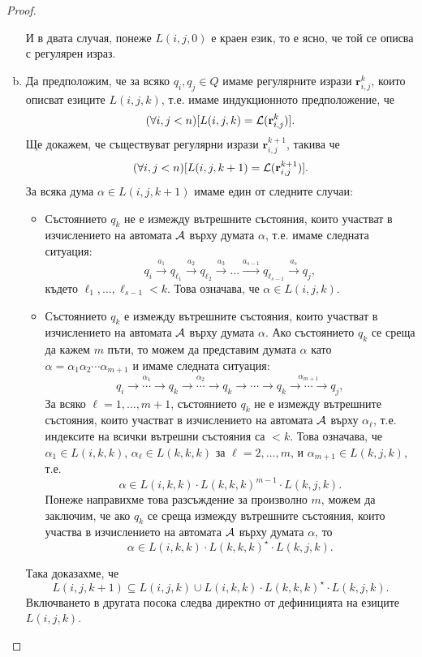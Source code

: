 \begin{proof}
\begin{enumerate}[a)]
    И в двата случая, понеже $L(i,j,0)$ е краен език, то е ясно, че той се описва с регулярен израз.
  \item
    Да предположим, че за всяко $q_i,q_j\in Q$ имаме регулярните изрази $\mathbf{r}^{k}_{i,j}$, които
    описват езиците $L(i,j,k)$, т.е. имаме индукционното предположение, че
    \[(\forall i,j < n)[L(i,j,k) = \mathcal{L}(\mathbf{r}^{k}_{i,j})].\] 
    Ще докажем, че съществуват регулярни изрази $\mathbf{r}^{k+1}_{i,j}$, такива че
    \[(\forall i,j < n)[L(i,j,k+1) = \mathcal{L}(\mathbf{r}^{k+1}_{i,j})].\] 
    За всяка дума $\alpha \in L(i,j,k+1)$ имаме един от следните случаи:
    \begin{itemize}
    \item
      Състоянието $q_k$ не е измежду вътрешните състояния, които участват в изчислението на автомата $\mathcal{A}$ върху думата $\alpha$, т.е. имаме следната ситуация:
      \[q_i\stackrel{a_1}{\rightarrow} q_{\ell_1} \stackrel{a_2}{\rightarrow} q_{\ell_2} \stackrel{a_3}{\rightarrow} \dots \stackrel{a_{s-1}}{\rightarrow} q_{\ell_{s-1}}\stackrel{a_s}{\rightarrow} q_j,\]
      където $\ell_1,\dots,\ell_{s-1} < k$.
      Това означава, че $\alpha \in L(i,j,k)$.
    \item
      Състоянието $q_k$ е измежду вътрешните състояния, които участват в изчислението на автомата $\mathcal{A}$ върху думата $\alpha$.
      Ако състоянието $q_k$ се среща да кажем $m$ пъти, то можем да представим думата $\alpha$ като $\alpha = \alpha_1\alpha_2\cdots\alpha_{m+1}$ и имаме следната ситуация:
      \[q_i\stackrel{\alpha_1}{\rightarrow\cdots\rightarrow} q_{k} \stackrel{\alpha_2}{\rightarrow\cdots\rightarrow} q_k \rightarrow\cdots\rightarrow q_{k} \stackrel{\alpha_{m+1}}{\rightarrow\cdots\rightarrow} q_j,\]
      За всяко $\ell=1,\dots,m+1$, състоянието $q_k$ не е измежду вътрешните състояния, които участват в изчислението на автомата $\mathcal{A}$ върху $\alpha_\ell$, т.е. индексите на всички вътрешни състояния са $<k$.
      Това означава, че $\alpha_1 \in L(i,k,k)$, $\alpha_\ell \in L(k,k,k)$ за $\ell=2,\dots,m$, и $\alpha_{m+1} \in L(k,j,k)$, т.е.
      \[\alpha \in L(i,k,k) \cdot L(k,k,k)^{m-1} \cdot L(k,j,k).\]
      Понеже направихме това разсъждение за произволно $m$,
      можем да заключим, че ако $q_k$ се среща измежду вътрешните състояния, които участва в изчислението на автомата $\mathcal{A}$ върху думата $\alpha$,
      то \[\alpha \in L(i,k,k) \cdot L(k,k,k)^\star \cdot L(k,j,k).\]
    \end{itemize}
    Така доказахме, че 
    \[L(i,j,k+1) \subseteq L(i,j,k) \cup L(i,k,k) \cdot L(k,k,k)^\star \cdot L(k,j,k).\]
    Включването в другата посока следва директно от дефиницията на езиците $L(i,j,k)$.
    

\end{enumerate}
\end{proof}
